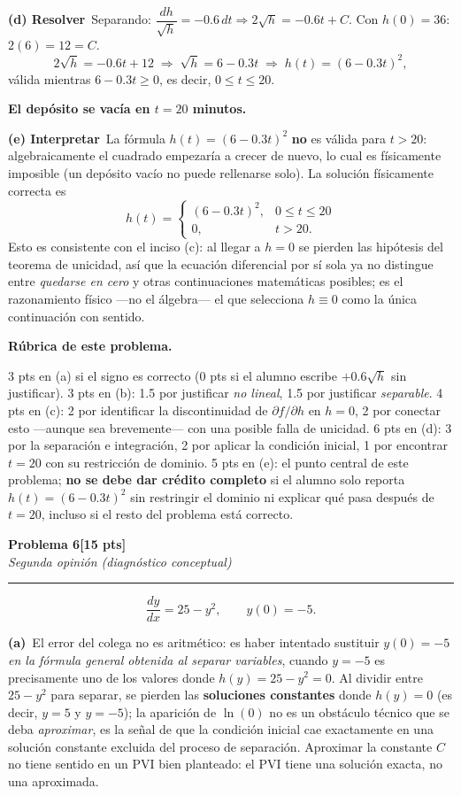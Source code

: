 \documentclass[11pt,letterpaper]{article}
\newcommand{\problema}[3]{%
  \bigskip\bigskip\noindent
  {\Large\textbf{Problema #1}}\hfill\textbf{[#2 pts]}\\[3pt]
  {\small\itshape #3}\par
  \vspace{2pt}\hrule\vspace{8pt}
}
\newcommand{\subparte}[2]{%
  \medskip\noindent\textbf{(#1}\ #2\par\smallskip
}
\newenvironment{resultado}
  {\begin{mdframed}[linecolor=black,linewidth=0.6pt,
    innerleftmargin=6pt,innerrightmargin=6pt,innertopmargin=4pt,innerbottommargin=4pt]
   \bfseries}
  {\end{mdframed}}
\newenvironment{rubrica}{%
  \begin{mdframed}[linecolor=black,linewidth=0.6pt,
    innerleftmargin=8pt,innerrightmargin=8pt,innertopmargin=5pt,innerbottommargin=5pt]
  \small\textbf{Rúbrica de este problema.}\par\smallskip
}{\end{mdframed}}
\begin{document}
\subparte{d) Resolver}{Separando: $\dfrac{dh}{\sqrt h} = -0.6\,dt \Rightarrow 2\sqrt h = -0.6t + C$. Con $h(0)=36$: $2(6)=12=C$.
\[
2\sqrt{h} = -0.6t + 12 \;\Longrightarrow\; \sqrt{h} = 6-0.3t \;\Longrightarrow\; h(t) = (6-0.3t)^2,
\]
válida mientras $6-0.3t \geq 0$, es decir, $0\le t\le 20$.
\begin{resultado}
El depósito se vacía en $t=20$ minutos.
\end{resultado}}

\subparte{e) Interpretar}{La fórmula $h(t)=(6-0.3t)^2$ \textbf{no} es válida para $t>20$: algebraicamente el cuadrado empezaría a crecer de nuevo, lo cual es físicamente imposible (un depósito vacío no puede rellenarse solo). La solución físicamente correcta es
\[
h(t) = \begin{cases} (6-0.3t)^2, & 0 \le t \le 20 \\ 0, & t > 20. \end{cases}
\]
Esto es consistente con el inciso (c): al llegar a $h=0$ se pierden las hipótesis del teorema de unicidad, así que la ecuación diferencial por sí sola ya no distingue entre \emph{quedarse en cero} y otras continuaciones matemáticas posibles; es el razonamiento físico —no el álgebra— el que selecciona $h\equiv0$ como la única continuación con sentido.}

\begin{rubrica}
3 pts en (a) si el signo es correcto (0 pts si el alumno escribe $+0.6\sqrt h$ sin justificar). 3 pts en (b): 1.5 por justificar \emph{no lineal}, 1.5 por justificar \emph{separable}. 4 pts en (c): 2 por identificar la discontinuidad de $\partial f/\partial h$ en $h=0$, 2 por conectar esto —aunque sea brevemente— con una posible falla de unicidad. 6 pts en (d): 3 por la separación e integración, 2 por aplicar la condición inicial, 1 por encontrar $t=20$ con su restricción de dominio. 5 pts en (e): el punto central de este problema; \textbf{no se debe dar crédito completo} si el alumno solo reporta $h(t)=(6-0.3t)^2$ sin restringir el dominio ni explicar qué pasa después de $t=20$, incluso si el resto del problema está correcto.
\end{rubrica}

\newpage
\problema{6}{15}{Segunda opinión (diagnóstico conceptual)}

\[
\frac{dy}{dx} = 25-y^2, \qquad y(0)=-5.
\]

\subparte{a)}{El error del colega no es aritmético: es haber intentado sustituir $y(0)=-5$ \emph{en la fórmula general obtenida al separar variables}, cuando $y=-5$ es precisamente uno de los valores donde $h(y)=25-y^2=0$. Al dividir entre $25-y^2$ para separar, se pierden las \textbf{soluciones constantes} donde $h(y)=0$ (es decir, $y=5$ y $y=-5$); la aparición de $\ln(0)$ no es un obstáculo técnico que se deba \emph{aproximar}, es la señal de que la condición inicial cae exactamente en una solución constante excluida del proceso de separación. Aproximar la constante $C$ no tiene sentido en un PVI bien planteado: el PVI tiene una solución exacta, no una aproximada.}
\end{document}
